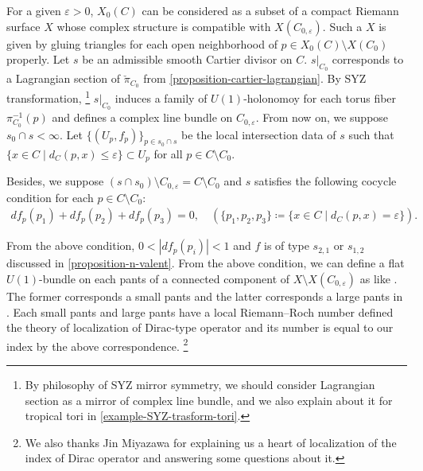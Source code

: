 \documentclass[a4paper,dvipdfmx,reqno,12pt]{amsart}
\theoremstyle{definition}
\newcommand{\deq}{\coloneqq}
\newcommand{\vep}{\varepsilon}%
\newcommand{\myfootnote}[1]{\hspace{-5pt}\footnote{#1}}
\numberwithin{equation}{section}
\begin{document}
For a given $\vep>0$, $X_0(C)$ can be considered as a subset of a compact 
Riemann surface $X$ whose complex structure is 
compatible with $X(C_{0,\vep})$. 
Such a $X$ is given by gluing triangles for 
each open neighborhood of $p\in X_0(C)\setminus X(C_0)$
properly.
Let $s$ be an admissible smooth Cartier divisor on $C$.
$s|_{C_0}$ corresponds to a Lagrangian section of 
$\check{\pi}_{C_0}$ from 
\cref{proposition-cartier-lagrangian}.
By SYZ transformation,
\myfootnote{By philosophy of SYZ mirror symmetry,
we should consider Lagrangian section 
as a mirror of complex line bundle,
and we also explain about it for tropical tori in 
\cref{example-SYZ-trasform-tori}.
}
$s|_ {C_0}$ induces a family of $U(1)$-holonomoy for
each torus fiber $\pi_{C_0}^{-1}(p)$ and defines a 
complex line bundle on $C_{0,\vep}$. From now on, 
we suppose $s_0\cap s<\infty$. 
Let $\{(U_p, f_p)\}_{p\in s_0\cap s}$ be the local intersection data 
of $s$ such that 
$\{x\in C\mid d_C(p,x)\leq \vep\}\subset U_p$ for
all $p\in C\setminus C_0$.

Besides, we suppose 
$(s\cap s_0)\setminus C_{0,\vep}=C\setminus C_0$ and $s$ satisfies the following cocycle
condition for each $p\in C\setminus C_0$:
\begin{align}
df_p(p_1)+df_p(p_2)+df_p(p_3)=0,\quad 
(\{p_1,p_2,p_3\}\deq \{x\in C\mid d_C(p,x)=\vep\}).
\end{align}

From the above condition, $0<|df_p(p_i)|<1$ and
$f$ is of type $s_{2,1}$ or $s_{1,2}$ discussed
in \cref{proposition-n-valent}.
From the above condition, we can define 
a flat $U(1)$-bundle on each pants of a 
connected component of $X\setminus X(C_{0,\vep})$
as like \cite[6.1.3]{MR2676658}. The former 
corresponds a small pants and the latter
corresponds a large pants in 
\cite[Definition 6.3]{MR2676658}.
Each small pants and large pants have a local 
Riemann--Roch number defined the theory of 
localization of Dirac-type operator and its 
number is equal 
to our index by the above correspondence.
\myfootnote{
We also thanks Jin Miyazawa
for explaining us a heart of localization of 
the index of Dirac operator and answering some 
questions about it.}
\end{document}
